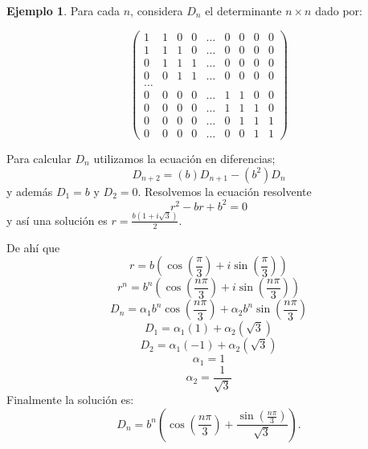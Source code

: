 \documentclass{report}
\theoremstyle{definition}
\newtheorem{ejemplo}[teorema]{Ejemplo}
\begin{document}
\begin{ejemplo}

  Para cada $n$, considera $D_{n}$ el determinante $n\times n$ dado por:

\begin{equation*}
\begin{pmatrix}
1 & 1 & 0 & 0 &\ldots & 0 & 0 & 0 & 0\\
1 & 1 & 1 & 0 &\ldots & 0 & 0 & 0 & 0\\
0 & 1 & 1 & 1 &\ldots & 0 & 0 & 0 & 0\\
0 & 0 & 1 & 1 &\ldots & 0 & 0 & 0 & 0\\
\ldots\\
0 & 0 & 0 & 0 &\ldots & 1 & 1 & 0 & 0\\
0 & 0 & 0 & 0 &\ldots & 1 & 1 & 1 & 0\\
0 & 0 & 0 & 0 &\ldots & 0 & 1 & 1 & 1\\
0 & 0 & 0 & 0 &\ldots & 0 & 0 & 1 & 1
\end{pmatrix}
\end{equation*}


Para calcular $D_{n}$ utilizamos la ecuación en diferencias;
\begin{equation}
  \label{determinante2}
D_{n+2}=(b)D_{n+1}-(b^2)D_{n}
\end{equation}
 y además $D_{1}=b$ y $D_{2}=0$.
Resolvemos la ecuación resolvente $$r^{2}-br+b^2=0$$ y así una solución es $r=\frac{b(1+i \sqrt{3})}{2}$.

De ahí que
  $$r=b(\cos(\frac{\pi}{3})+i\sin(\frac{\pi}{3}))$$
  $$r^n=b^n(\cos(\frac{n\pi}{3})+i\sin(\frac{n\pi}{3}))$$
  $$D_{n}=\alpha_{1}b^n\cos(\frac{n\pi}{3})+\alpha_{2}b^n\sin(\frac{n\pi}{3})$$
  $$D_{1}=\alpha_{1}(1)+\alpha_{2}(\sqrt{3})$$
  $$D_{2}=\alpha_{1}(-1)+\alpha_{2}(\sqrt{3})$$
  $$\alpha_{1}=1$$
  $$\alpha_{2}=\frac{1}{\sqrt{3}}$$
Finalmente la solución es:
\begin{equation}
  \label{solucion determinante2}
D_{n}=b^n(\cos(\frac{n\pi}{3})+\frac{\sin(\frac{n\pi}{3})}{\sqrt{3}}).
\end{equation}
\end{ejemplo}
\end{document}
